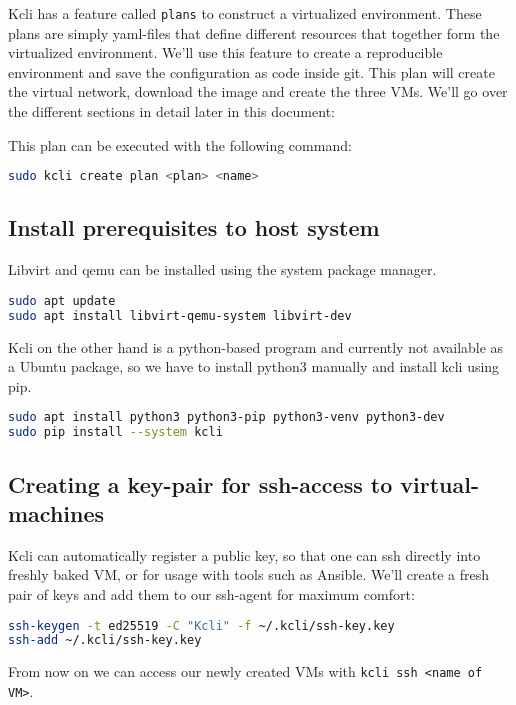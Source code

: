 \noindent Kcli has a feature called \texttt{plans} to construct a virtualized environment. These plans are simply yaml-files that define different resources that together form the virtualized environment.
We'll use this feature to create a reproducible environment and save the configuration as code inside git. This plan will create the virtual network, download the image and create the three VMs. We'll go over the different sections in detail later in this document:

This plan can be executed with the following command:
\begin{lstlisting}[language=bash]
sudo kcli create plan <plan> <name>
\end{lstlisting}

\subsection{Install prerequisites to host system}
Libvirt and qemu can be installed using the system package manager.
\begin{lstlisting}[language=bash] 
sudo apt update
sudo apt install libvirt-qemu-system libvirt-dev
\end{lstlisting}
Kcli on the other hand is a python-based program and currently not available as a Ubuntu package, so we have to install python3 manually and install kcli using pip.
\begin{lstlisting}[language=bash] 
sudo apt install python3 python3-pip python3-venv python3-dev
sudo pip install --system kcli
\end{lstlisting}

\subsection{Creating a key-pair for ssh-access to virtual-machines}
Kcli can automatically register a public key, so that one can ssh directly into freshly baked VM, or for usage with tools such as Ansible.
We'll create a fresh pair of keys and add them to our ssh-agent for maximum comfort:
\begin{lstlisting}[language=bash,caption=Create SSH-Keypair for Kcli] 
ssh-keygen -t ed25519 -C "Kcli" -f ~/.kcli/ssh-key.key
ssh-add ~/.kcli/ssh-key.key
\end{lstlisting}
From now on we can access our newly created VMs with \texttt{kcli ssh <name of VM>}.
